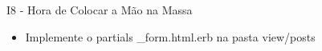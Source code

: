 \begin{frame}[t, fragile]{I8 - Hora de Colocar a Mão na Massa}
	\begin{itemize}		
		\item Implemente o partials \alert{\_form.html.erb} na pasta \alert{view/posts}
	\end{itemize}
\end{frame}